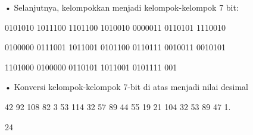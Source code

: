 \documentclass{article}
\begin{document}

• Selanjutnya, kelompokkan menjadi kelompok-kelompok 7 bit:

0101010 1011100 1101100 1010010 0000011 0110101 1110010

0100000 0111001 1011001 0101100 0110111 0010011 0010101

1101000 0100000 0110101 1011001 0101111 001

• Konversi kelompok-kelompok 7-bit di atas menjadi nilai desimal

42 92 108 82 3 53 114 32 57 89 44 55 19 21 104 32 53 89 47 1.

24
\end{document}
